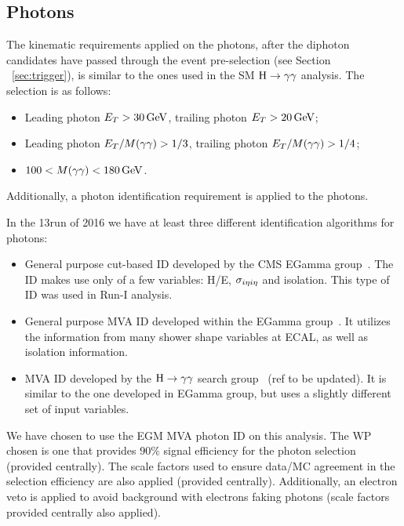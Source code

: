 \subsection{Photons}
\label{sec:photons}

The kinematic requirements applied on the photons, after the diphoton candidates have passed through the event pre-selection (see Section ~\ref{sec:trigger}), is similar to the ones used in the SM $\mathrm{H}\to\gamma\gamma$ analysis. The selection is as follows:
\begin{itemize}
\item Leading photon $E_{T} > 30 \,\text{Ge\hspace{-.08em}V}$, trailing photon $E_{T}>20 \,\text{Ge\hspace{-.08em}V}$;
\item Leading photon $E_{T}/M(\gamma\gamma) > 1/3$, trailing photon $E_{T}/M(\gamma\gamma) > 1/4$;
\item $100 < M(\gamma\gamma) < 180 \,\text{Ge\hspace{-.08em}V}$.
\end{itemize}
Additionally, a photon identification requirement is applied to the photons.

In the 13\TeV run of 2016 we have at least three different identification algorithms for
photons:
\begin{itemize}
\item General purpose cut-based ID developed by the CMS EGamma
  group~\cite{PhotonCutBasedID-twiki}. The ID makes use only of a few variables: H/E,
  $\sigma_{i\eta i\eta}$ and isolation. This type of ID was used in Run-I analysis.
\item General purpose MVA ID developed within the EGamma
  group~\cite{PhotonMvaID-twiki}. It utilizes the information from many shower shape
  variables at ECAL, as well as isolation information.
\item MVA ID developed by the $\mathrm{H}\to\gamma\gamma$ search group~\cite{HggMvaID-slides} (ref to be
  updated). It is similar to the one developed in EGamma group, but uses a slightly
  different set of input variables.
\end{itemize}

We have chosen to use the EGM MVA photon ID on this analysis. 
The WP chosen is one that provides $90\%$ signal efficiency for the photon selection (provided centrally). 
The scale factors used to ensure data/MC agreement in the selection efficiency are also applied (provided centrally).
Additionally, an electron veto is applied to avoid background with electrons faking photons (scale factors provided centrally also applied).



